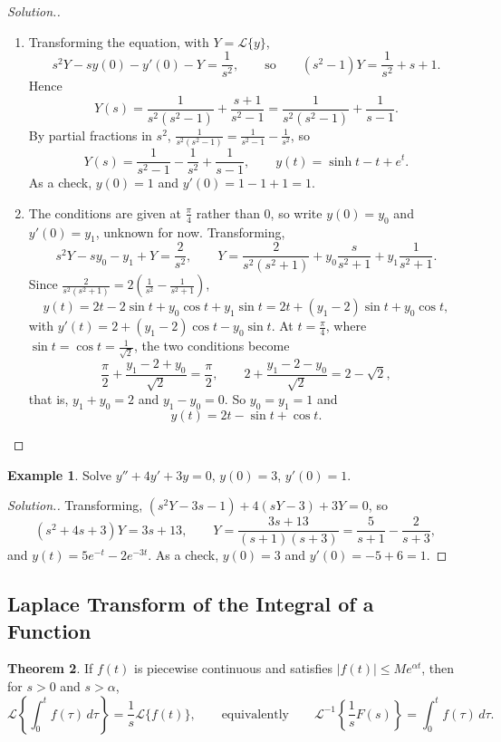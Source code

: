 \documentclass[11pt,a4paper]{article}
\theoremstyle{definition}
\newtheorem{thm}{Theorem}[subsection]
\newtheorem{exa}[thm]{Example}
\newenvironment{solution}
  {\renewcommand{\qedsymbol}{}\begin{proof}[\textit{Solution}.]}
  {\end{proof}}
\begin{document}
\begin{solution}
\begin{enumerate}
\item Transforming the equation, with $Y = \mathcal{L}\{y\}$,
\[s^2 Y -s y(0) - y'(0) - Y = \frac{1}{s^2},\qquad\text{so}\qquad (s^2 - 1)Y =
\frac{1}{s^2}+ s + 1 .\]
Hence
\[Y(s) = \frac{1}{s^2(s^2-1)} + \frac{s + 1}{s^2 - 1} = \frac{1}{s^2(s^2-1)} +
\frac{1}{s-1} .\]
By partial fractions in $s^2$, $\frac{1}{s^2(s^2 - 1)} = \frac{1}{s^2 -1} -
\frac{1}{s^2}$, so
\[Y(s) = \frac{1}{s^2 - 1} - \frac{1}{s^2} + \frac{1}{s - 1},\qquad y(t) =
\sinh t - t + e^t .\]
As a check, $y(0) = 1$ and $y'(0) = 1 - 1 + 1 = 1$.

\item The conditions are given at $\frac{\pi}{4}$ rather than $0$, so write
$y(0) = y_0$ and $y'(0) = y_1$, unknown for now. Transforming,
\[s^2Y - sy_0 - y_1 + Y = \frac{2}{s^2},\qquad Y = \frac{2}{s^2 (s^2 + 1)} +
y_0\frac{s}{s^2 + 1} + y_1\frac{1}{s^2 + 1} .\]
Since $\frac{2}{s^2(s^2 + 1)} = 2\left(\frac{1}{s^2} - \frac{1}{s^2 +
1}\right)$,
\[y(t) = 2t - 2\sin t + y_0 \cos t + y_1\sin t = 2t + (y_1 - 2)\sin t + y_0\cos t
,\]
with $y'(t) = 2 + (y_1 - 2)\cos t - y_0\sin t$. At $t = \frac{\pi}{4}$, where
$\sin t = \cos t = \frac{1}{\sqrt2}$, the two conditions become
\[\frac{\pi}{2} + \frac{y_1 - 2 + y_0}{\sqrt{2}} = \frac{\pi}{2},\qquad 2 +
\frac{y_1 - 2 - y_0}{\sqrt{2}} = 2 - \sqrt2 ,\]
that is, $y_1 + y_0 = 2$ and $y_1 - y_0 = 0$. So $y_0 = y_1 = 1$ and
\[y(t) = 2t - \sin t + \cos t .\]
\end{enumerate}
\end{solution}

\begin{exa}
\label{ex:lapivp2}
Solve $y'' + 4y' + 3y = 0$, $y(0) = 3$, $y'(0) = 1$.
\end{exa}

\begin{solution}
Transforming, $(s^2Y - 3s - 1) + 4(sY - 3) + 3Y = 0$, so
\[(s^2 + 4s + 3)Y = 3s + 13,\qquad Y = \frac{3s + 13}{(s + 1)(s + 3)} =
\frac{5}{s + 1} - \frac{2}{s + 3},\]
and $y(t) = 5e^{-t} - 2e^{-3t}$. As a check, $y(0) = 3$ and $y'(0) = -5 + 6 = 1$.
\end{solution}

{\color[wave]{485}\subsection{Laplace Transform of the Integral of a Function}}

\begin{thm}
\label{thm:lapintegral}
If $f(t)$ is piecewise continuous and satisfies $|f(t)|\leq Me^{\alpha t}$, then
for $s>0$ and $s>\alpha$,
\[\mathcal{L}\left\{\int^t_0f(\tau)\, d\tau\right\} = \frac{1}{s}
\mathcal{L}\{f(t)\},\qquad\text{equivalently}\qquad
\mathcal{L}^{-1}\left\{\frac{1}{s}F(s)\right\} = \int^t_0f(\tau)\, d\tau .\]
\end{thm}
\end{document}
